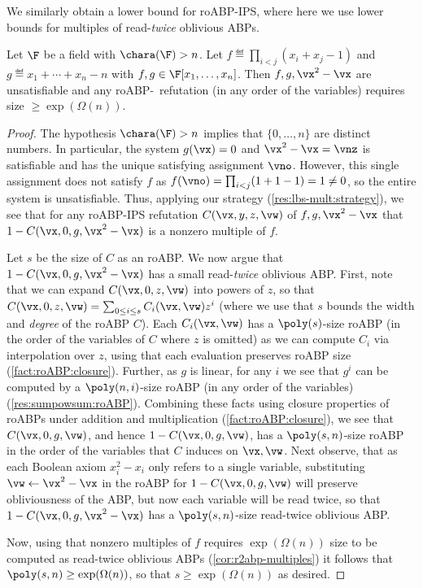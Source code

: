 \documentclass{toc}
\begin{document}
We similarly obtain a lower bound for roABP-IPS, where here we use lower bounds for multiples of read-\emph{twice} oblivious ABPs.

\begin{corollary}\label{res:lbs-ips:mult:roABP}
        Let $\F$ be a field with $\chara(\F)>n$. Let $f\eqdef \prod_{i<j}(x_i+x_j-1)$ and $g\eqdef x_1+\cdots+x_n-n$ with $f,g\in\F[x_1,\ldots,x_n]$.  Then $f,g,\vx^2-\vx$ are unsatisfiable and any roABP-\IPS\ refutation (in any order of the variables) requires size $\ge\exp(\Omega(n))$.
\end{corollary}
\begin{proof}
        The hypothesis $\chara(\F)>n$ implies that $\{0,\ldots,n\}$ are distinct numbers.  In particular, the system $g(\vx)=0$ and $\vx^2-\vx=\vnz$ is satisfiable and has the unique satisfying assignment $\vno$.  However, this single assignment does not satisfy $f$ as $f(\vno)=\prod_{i<j}(1+1-1)=1\ne0$, so the entire system is unsatisfiable.  Thus, applying our strategy (\autoref{res:lbs-mult:strategy}), we see that for any roABP-IPS refutation $C(\vx,y,z,\vw)$ of $f,g,\vx^2-\vx$ that $1-C(\vx,0,g,\vx^2-\vx)$ is a nonzero multiple of $f$.

  Let $s$ be the size of $C$ as an roABP.  %
%
We  %
now argue that $1-C(\vx,0,g,\vx^2-\vx)$ has a small read-\emph{twice} oblivious ABP\@.  First, note that we can expand $C(\vx,0,z,\vw)$ into powers of $z$, so that $C(\vx,0,z,\vw)=\sum_{0\le i\le s} C_i(\vx,\vw)z^i$ (where we use that $s$ bounds the width and \emph{degree} of the roABP $C$).  Each $C_i(\vx,\vw)$ has a $\poly(s)$-size roABP (in the order of the variables of $C$ where $z$ is omitted) as we can compute $C_i$ via interpolation over $z$, using that each evaluation preserves roABP size (\autoref{fact:roABP:closure}).  Further, as $g$ is linear, for any $i$ we see that $g^i$ can be computed by a $\poly(n,i)$-size roABP (in any order of the variables) (\autoref{res:sumpowsum:roABP}).  Combining these facts using closure properties of roABPs under addition and multiplication (\autoref{fact:roABP:closure}), we see that $C(\vx,0,g,\vw)$, and hence $1-C(\vx,0,g,\vw)$, has a $\poly(s,n)$-size roABP in the order of the variables that $C$ induces on $\vx,\vw$.  Next observe, that as each Boolean axiom $x_i^2-x_i$ only refers to a single variable, substituting $\vw\leftarrow\vx^2-\vx$ in the roABP for $1-C(\vx,0,g,\vw)$ will preserve obliviousness of the ABP, but now each variable will be read twice, so that $1-C(\vx,0,g,\vx^2-\vx)$ has a $\poly(s,n)$-size read-twice oblivious ABP.

        Now, using that nonzero multiples of $f$ requires
%
$\exp(\Omega(n))$ size   %
to be computed as read-twice oblivious ABPs (\autoref{cor:r2abp-multiples}) it follows that $\poly(s,n)\ge\exp(\Omega(n))$, so that $s\ge\exp(\Omega(n))$ as desired.
\end{proof}
\end{document}
